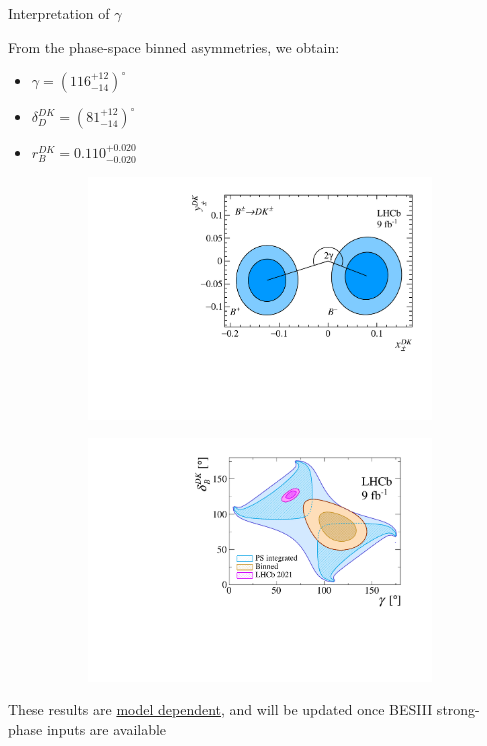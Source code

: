 \documentclass[xcolor={dvipsnames}]{beamer}
\begin{document}
\begin{frame}{Interpretation of $\gamma$}
  \begin{center}
    \large From the phase-space binned asymmetries, we obtain:
  \end{center}
  \begin{itemize}
    \item{$\gamma = (116^{+12}_{-14})^\circ$}
    \item{$\delta_D^{DK} = (81^{+12}_{-14})^\circ$}
    \item{$r_B^{DK} = 0.110^{+0.020}_{-0.020}$}
  \end{itemize}
  \begin{figure}[htb]
    \centering
    \begin{subfigure}{0.5\textwidth}
      \includegraphics[width=1\textwidth]{Plots/B2DK_CP_Observables_Contours.pdf}
    \end{subfigure}%
    \begin{subfigure}{0.5\textwidth}
      \includegraphics[width=1\textwidth]{Plots/gammacharm_lhcb_KKpipi_GLW_KKpipi_GGSZ_lhcb_2020_beauty_and_charm_g_d_dk.pdf}
    \end{subfigure}
  \end{figure}
  \begin{center}
    {\large These results are \underline{model dependent}, and will be updated once BESIII strong-phase inputs are available}
  \end{center}
\end{frame}
\end{document}
